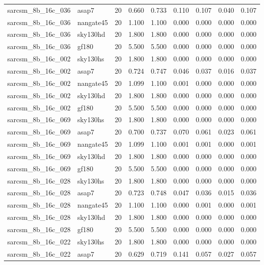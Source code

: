 \begin{tabular}{llrrrrrrr}
sarcsm\_8b\_16c\_036 & asap7 & 20 & 0.660 & 0.733 & 0.110 & 0.107 & 0.040 & 0.107 \\
sarcsm\_8b\_16c\_036 & nangate45 & 20 & 1.100 & 1.100 & 0.000 & 0.000 & 0.000 & 0.000 \\
sarcsm\_8b\_16c\_036 & sky130hd & 20 & 1.800 & 1.800 & 0.000 & 0.000 & 0.000 & 0.000 \\
sarcsm\_8b\_16c\_036 & gf180 & 20 & 5.500 & 5.500 & 0.000 & 0.000 & 0.000 & 0.000 \\
sarcsm\_8b\_16c\_002 & sky130hs & 20 & 1.800 & 1.800 & 0.000 & 0.000 & 0.000 & 0.000 \\
sarcsm\_8b\_16c\_002 & asap7 & 20 & 0.724 & 0.747 & 0.046 & 0.037 & 0.016 & 0.037 \\
sarcsm\_8b\_16c\_002 & nangate45 & 20 & 1.099 & 1.100 & 0.001 & 0.000 & 0.000 & 0.000 \\
sarcsm\_8b\_16c\_002 & sky130hd & 20 & 1.800 & 1.800 & 0.000 & 0.000 & 0.000 & 0.000 \\
sarcsm\_8b\_16c\_002 & gf180 & 20 & 5.500 & 5.500 & 0.000 & 0.000 & 0.000 & 0.000 \\
sarcsm\_8b\_16c\_069 & sky130hs & 20 & 1.800 & 1.800 & 0.000 & 0.000 & 0.000 & 0.000 \\
sarcsm\_8b\_16c\_069 & asap7 & 20 & 0.700 & 0.737 & 0.070 & 0.061 & 0.023 & 0.061 \\
sarcsm\_8b\_16c\_069 & nangate45 & 20 & 1.099 & 1.100 & 0.001 & 0.001 & 0.000 & 0.001 \\
sarcsm\_8b\_16c\_069 & sky130hd & 20 & 1.800 & 1.800 & 0.000 & 0.000 & 0.000 & 0.000 \\
sarcsm\_8b\_16c\_069 & gf180 & 20 & 5.500 & 5.500 & 0.000 & 0.000 & 0.000 & 0.000 \\
sarcsm\_8b\_16c\_028 & sky130hs & 20 & 1.800 & 1.800 & 0.000 & 0.000 & 0.000 & 0.000 \\
sarcsm\_8b\_16c\_028 & asap7 & 20 & 0.723 & 0.748 & 0.047 & 0.036 & 0.015 & 0.036 \\
sarcsm\_8b\_16c\_028 & nangate45 & 20 & 1.100 & 1.100 & 0.000 & 0.001 & 0.000 & 0.001 \\
sarcsm\_8b\_16c\_028 & sky130hd & 20 & 1.800 & 1.800 & 0.000 & 0.000 & 0.000 & 0.000 \\
sarcsm\_8b\_16c\_028 & gf180 & 20 & 5.500 & 5.500 & 0.000 & 0.000 & 0.000 & 0.000 \\
sarcsm\_8b\_16c\_022 & sky130hs & 20 & 1.800 & 1.800 & 0.000 & 0.000 & 0.000 & 0.000 \\
sarcsm\_8b\_16c\_022 & asap7 & 20 & 0.629 & 0.719 & 0.141 & 0.057 & 0.027 & 0.057 \\

\end{tabular}
